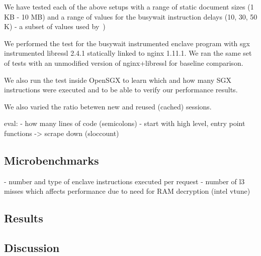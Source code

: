 \documentclass[../main.tex]{subfiles}
\begin{document}
We have tested each of the above setups with a range of static document sizes
(1 KB - 10 MB) and a range of values for the busywait instruction delays (10,
30, 50 K) - a subset of values used by~\cite{Baumann14})

We performed the test for the busywait instrumented enclave program with sgx
instrumented libressl 2.4.1 statically linked to nginx 1.11.1. We ran the same
set of tests with an unmodified version of nginx+libressl for baseline
comparison.

We also run the test inside OpenSGX to learn which and how many SGX
instructions were executed and to be able to verify our performance results.

We also varied the ratio betewen new and reused (cached) sessions.

eval:
  - how many lines of code  (semicolons)
    - start with high level, entry point functions -> scrape down (sloccount)

\subsection{Microbenchmarks}
 - number and type of enclave instructions executed per request
 - number of l3 misses which affects performance due to need for RAM decryption
 (intel vtune)

\subsection{Results}


\subsection{Discussion}
\end{document}
